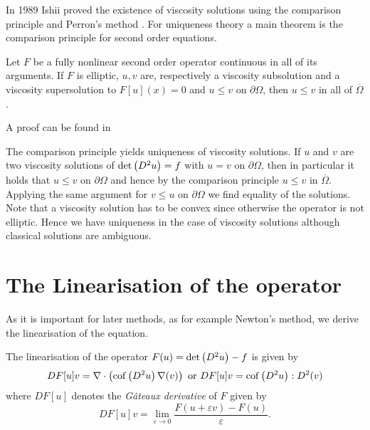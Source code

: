 In 1989 Ishii proved the existence of viscosity solutions using the comparison principle and Perron's method \cite{Ishii1989}. For uniqueness theory a main theorem is the comparison principle for second order equations.

\begin{theorem}
	Let $F$ be a fully nonlinear second order operator continuous in all of its arguments.
	If $F$ is elliptic,	$u,v$ are, respectively a viscosity subsolution and a viscosity supersolution to $F[u](x)=0$ and $u \leq v$ on $\partial \Omega$, then $u \leq v$ in all of $\overline \Omega$.
\end{theorem}
A proof can be found in \cite[Theorem 17.1]{GT1983}

The comparison principle yields uniqueness of viscosity solutions. If $u$ and $v$ are two viscosity solutions of $\det{\left(D^2 u\right)}=f$ with $u=v$ on $\partial \Omega$, then in particular it holds that $u \leq v$ on $\partial \Omega$ and hence by the comparison principle $u \leq v$ in  $\overline \Omega$. Applying the same argument for $v \leq u$ on $\partial \Omega$ we find equality of the solutions. Note that a viscosity solution has to be convex since otherwise the \MA operator is not elliptic. Hence we have uniqueness in the case of viscosity solutions although classical solutions are ambiguous.

\section{The Linearisation of the \MA operator}\label{sec: linearisation}

As it is important for later methods, as for example Newton's method, we derive the linearisation of the \MA equation. 
	\begin{theorem}[Linearisation] \label{thm: linearisation}
		The linearisation of the \MA operator $F(u)=\det{\left(D^2u\right)}-f$ is given by
		\begin{align}
			DF[u]v = \nabla \cdot \left( \operatorname{cof} \left( D^2 u  \right) \nabla (v) \right) \text{ or } DF[u]v=\operatorname{cof} \left( D^2 u \right):D^2 (v)		\end{align}
	where $DF[u]$ denotes the \emph{G\^ateaux derivative} of $F$ given by
	\[
		DF[u]v = \lim\limits_{\varepsilon \rightarrow 0} \frac { F(u+\varepsilon v) - F(u)}\varepsilon.
	\]
	\end{theorem}
		
